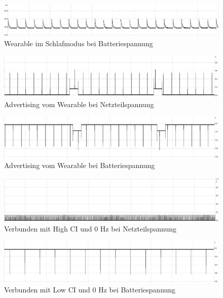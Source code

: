 \begin{figure}[!hbtp]
	\centering
	\includegraphics[width=1\linewidth]{res/idle.jpg}
	\caption{Wearable im Schlafmodus bei Batteriespannung}
	\label{fig:curSleep}
\end{figure}
\begin{figure}[!hbtp]
	\centering
	\includegraphics[width=1\linewidth]{res/wearNetzAdv.jpg}
	\caption{Advertising vom Wearable bei Netzteilspannung}
	\label{fig:curNetz}
\end{figure}
\begin{figure}[!hbtp]
	\centering
	\includegraphics[width=1\linewidth]{res/wearCrAdv.jpg}
	\caption{Advertising vom Wearable bei Batteriespannung}
	\label{fig:curCr}
\end{figure}
\begin{figure}[!hbtp]
	\centering
	\includegraphics[width=1\linewidth]{res/wearNetz0hz.jpg}
	\caption{Verbunden mit High CI und 0 Hz bei Netzteilspannung}
	\label{fig:curHiNetz}
\end{figure}
\begin{figure}[!hbtp]
	\centering
	\includegraphics[width=1\linewidth]{res/ciLo0.jpg}
	\caption{Verbunden mit Low CI und 0 Hz bei Batteriespannung}
	\label{fig:curLo}
\end{figure}
